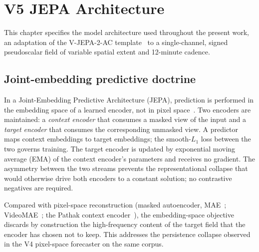 \chapter{V5 JEPA Architecture}
\label{ch:architecture}

This chapter specifies the model architecture used throughout the
present work, an adaptation of the V-JEPA-2-AC
template~\cite{vjepa2_2025,assran2024vjepa} to a single-channel,
signed pseudoscalar field of variable spatial extent and 12-minute
cadence.

\section{Joint-embedding predictive doctrine}
\label{sec:arch-doctrine}

In a Joint-Embedding Predictive Architecture (JEPA), prediction is
performed in the embedding space of a learned encoder, not in pixel
space~\cite{assran2023ijepa,lecun2022path}. Two encoders are
maintained: a \emph{context encoder} that consumes a masked view of
the input and a \emph{target encoder} that consumes the
corresponding unmasked view. A predictor maps context embeddings to
target embeddings; the smooth-$L_{1}$ loss between the two governs
training. The target encoder is updated by exponential moving
average (EMA) of the context encoder's parameters and receives no
gradient. The asymmetry between the two streams prevents the
representational collapse that would otherwise drive both encoders
to a constant solution; no contrastive negatives are required.

Compared with pixel-space reconstruction
(masked autoencoder, MAE~\cite{he2022mae}; VideoMAE~\cite{tong2022videomae}; the Pathak
context encoder~\cite{pathak2016contextencoders}), the
embedding-space objective discards by construction the high-frequency
content of the target field that the encoder has chosen not to keep.
This addresses the persistence collapse observed in the V4
pixel-space forecaster on the same corpus.

